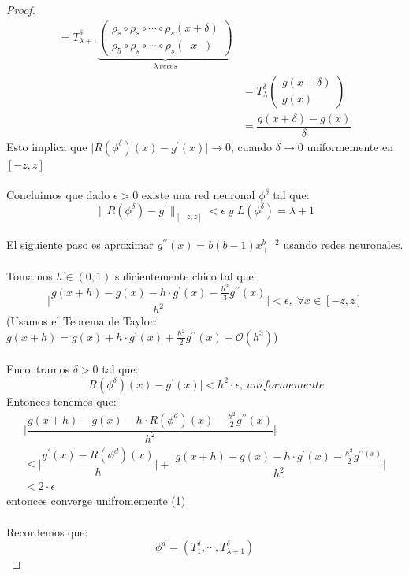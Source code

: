 \documentclass[12pt,a4paper]{book}
\providecommand{\abs}[1]{\lvert#1\rvert}
\providecommand{\norm}[1]{\lVert#1\rVert}
\begin{document}
\begin{proof}
\begin{equation*}
\begin{split}
=T_{\lambda +1}^{\delta}\underbrace{\left(\begin{matrix}
\rho_{s}\circ\rho_{s}\circ\cdots\circ\rho_{s}(x+\delta)\\
\rho_{5}\circ\rho_{s}\circ\cdots\circ\rho_{s}(\;\;x\;\;)
\end{matrix}\right)}_{\lambda\, veces}\\&
=T_{\lambda}^{\delta}\left(\begin{matrix}
g(x+\delta)\\
g(x)
\end{matrix}\right)\\&
=\dfrac{g(x+\delta)-g(x)}{\delta}
\end{split}
\end{equation*}
Esto implica que $\abs{R(\phi^{\delta})(x)-g^{\prime}(x)}\rightarrow 0$, cuando $\delta\rightarrow 0$ uniformemente en $[-z,z]$\\
\\
Concluimos que dado $\epsilon >0$ existe una red neuronal $\phi^{\delta}$ tal que: $$\norm{R(\phi^{\delta})-g^{\prime}}_{[-z,z]}<\epsilon\; y \; L(\phi^{\delta})=\lambda +1$$
\\
El siguiente paso es aproximar $g^{\prime\prime}(x)=b(b-1)x_{+}^{b-2}$ usando redes neuronales.\\
\\
Tomamos $h\in (0,1)$ suficientemente chico tal que:
$$\abs{\dfrac{g(x+h)-g(x)-h\cdot g^{\prime}(x)-\frac{h^{2}}{3}g^{\prime\prime}(x)}{h^{2}}}<\epsilon,\;\forall x\in[-z,z]$$
(Usamos el Teorema de Taylor: $g(x+h)=g(x)+h\cdot g^{\prime}(x)+\frac{h^{2}}{2}g^{\prime\prime}(x)+\mathcal{O}(h^{3})$)\\
\\
Encontramos $\delta >0$ tal que:
$$\abs{R(\phi^{\delta})(x)-g^{\prime}(x)}< h^{2}\cdot\epsilon,\,uniformemente$$
Entonces tenemos que:
\begin{equation*}
\begin{split}
\abs{\dfrac{g(x+h)-g(x)-h\cdot R(\phi^{d})(x)-\frac{h^{2}}{2}g^{\prime\prime}(x)}{h^{2}}}\\
\leq \abs{\dfrac{g^{\prime}(x)-R(\phi^{d})(x)}{h}}
+\abs{\dfrac{g(x+h)-g(x)-h\cdot g^{\prime}(x)-\frac{h^{2}}{2}g^{\prime\prime(x)}}{h^{2}}}\\
< 2\cdot\epsilon
\end{split}
\end{equation*}
entonces converge unifromemente (1)\\
\\ Recordemos que:
$$\phi^{d}=(T_{1}^{\delta},\cdots,T_{\lambda +1}^{\delta})$$

\end{proof}
\end{document}
